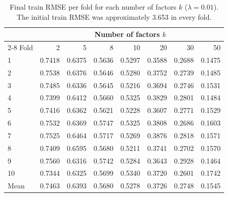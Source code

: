 	\begin{table}[ht]
		\centering
		\caption{Final train RMSE per fold for each number of factors $k$ ($\lambda = 0.01$).
			The initial train RMSE was approximately 3.653 in every fold.}
		\label{tab:fold-train}
		\begin{tabular}{@{}lrrrrrrr@{}}
			\toprule
			& \multicolumn{7}{c}{Number of factors $k$} \\
			\cmidrule(l){2-8}
			Fold & 2 & 5 & 8 & 10 & 20 & 30 & 50 \\
			\midrule
			1  & 0.7418 & 0.6375 & 0.5636 & 0.5297 & 0.3588 & 0.2688 & 0.1475 \\
			2  & 0.7538 & 0.6376 & 0.5646 & 0.5280 & 0.3752 & 0.2739 & 0.1485 \\
			3  & 0.7485 & 0.6336 & 0.5645 & 0.5216 & 0.3694 & 0.2746 & 0.1531 \\
			4  & 0.7399 & 0.6412 & 0.5660 & 0.5325 & 0.3829 & 0.2801 & 0.1484 \\
			5  & 0.7416 & 0.6362 & 0.5621 & 0.5228 & 0.3607 & 0.2771 & 0.1529 \\
			6  & 0.7532 & 0.6369 & 0.5747 & 0.5325 & 0.3808 & 0.2686 & 0.1603 \\
			7  & 0.7525 & 0.6464 & 0.5717 & 0.5269 & 0.3876 & 0.2818 & 0.1571 \\
			8  & 0.7409 & 0.6595 & 0.5680 & 0.5211 & 0.3741 & 0.2702 & 0.1570 \\
			9  & 0.7560 & 0.6316 & 0.5742 & 0.5284 & 0.3643 & 0.2928 & 0.1464 \\
			10 & 0.7344 & 0.6325 & 0.5699 & 0.5340 & 0.3720 & 0.2601 & 0.1742 \\
			\midrule
			Mean & 0.7463 & 0.6393 & 0.5680 & 0.5278 & 0.3726 & 0.2748 & 0.1545 \\
			\bottomrule
		\end{tabular}
	\end{table}
	
